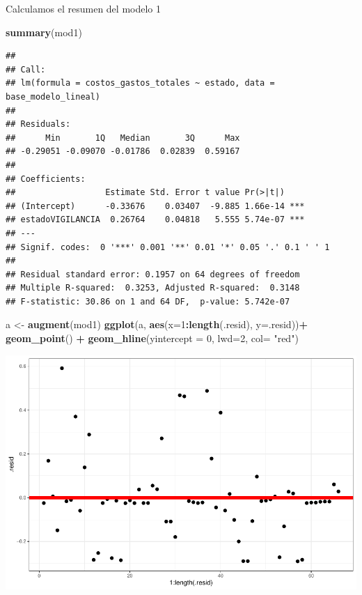 \documentclass[
  11pt,
  a4paper,
]{book}
\newenvironment{Shaded}{\begin{snugshade}}{\end{snugshade}}
\newcommand{\DataTypeTok}[1]{\textcolor[rgb]{0.13,0.29,0.53}{#1}}
\newcommand{\DecValTok}[1]{\textcolor[rgb]{0.00,0.00,0.81}{#1}}
\newcommand{\KeywordTok}[1]{\textcolor[rgb]{0.13,0.29,0.53}{\textbf{#1}}}
\newcommand{\NormalTok}[1]{#1}
\newcommand{\OperatorTok}[1]{\textcolor[rgb]{0.81,0.36,0.00}{\textbf{#1}}}
\newcommand{\StringTok}[1]{\textcolor[rgb]{0.31,0.60,0.02}{#1}}
\begin{document}
Calculamos el resumen del modelo 1

\begin{Shaded}
\begin{Highlighting}[]
\KeywordTok{summary}\NormalTok{(mod1)}
\end{Highlighting}
\end{Shaded}

\begin{verbatim}
## 
## Call:
## lm(formula = costos_gastos_totales ~ estado, data = base_modelo_lineal)
## 
## Residuals:
##      Min       1Q   Median       3Q      Max 
## -0.29051 -0.09070 -0.01786  0.02839  0.59167 
## 
## Coefficients:
##                  Estimate Std. Error t value Pr(>|t|)    
## (Intercept)      -0.33676    0.03407  -9.885 1.66e-14 ***
## estadoVIGILANCIA  0.26764    0.04818   5.555 5.74e-07 ***
## ---
## Signif. codes:  0 '***' 0.001 '**' 0.01 '*' 0.05 '.' 0.1 ' ' 1
## 
## Residual standard error: 0.1957 on 64 degrees of freedom
## Multiple R-squared:  0.3253, Adjusted R-squared:  0.3148 
## F-statistic: 30.86 on 1 and 64 DF,  p-value: 5.742e-07
\end{verbatim}

\begin{Shaded}
\begin{Highlighting}[]
\NormalTok{a <-}\StringTok{ }\KeywordTok{augment}\NormalTok{(mod1)}
\KeywordTok{ggplot}\NormalTok{(a, }\KeywordTok{aes}\NormalTok{(}\DataTypeTok{x=}\DecValTok{1}\OperatorTok{:}\KeywordTok{length}\NormalTok{(.resid), }\DataTypeTok{y=}\NormalTok{.resid))}\OperatorTok{+}
\StringTok{  }\KeywordTok{geom_point}\NormalTok{() }\OperatorTok{+}\StringTok{ }
\StringTok{  }\KeywordTok{geom_hline}\NormalTok{(}\DataTypeTok{yintercept =} \DecValTok{0}\NormalTok{, }\DataTypeTok{lwd=}\DecValTok{2}\NormalTok{, }\DataTypeTok{col=} \StringTok{"red"}\NormalTok{)}
\end{Highlighting}
\end{Shaded}

\includegraphics{index_files/figure-latex/unnamed-chunk-16-1.pdf}
\end{document}
